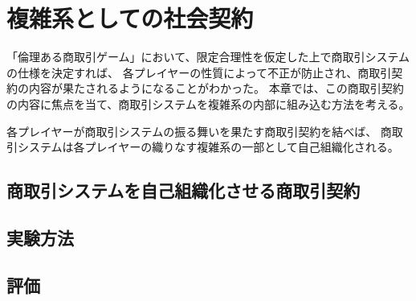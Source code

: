 \chapter{複雑系としての社会契約}
「倫理ある商取引ゲーム」において、限定合理性を仮定した上で商取引システムの仕様を決定すれば、
各プレイヤーの性質によって不正が防止され、商取引契約の内容が果たされるようになることがわかった。
本章では、この商取引契約の内容に焦点を当て、商取引システムを複雑系の内部に組み込む方法を考える。

各プレイヤーが商取引システムの振る舞いを果たす商取引契約を結べば、
商取引システムは各プレイヤーの織りなす複雑系の一部として自己組織化される。

\section{商取引システムを自己組織化させる商取引契約}

\section{実験方法}

\section{評価}
